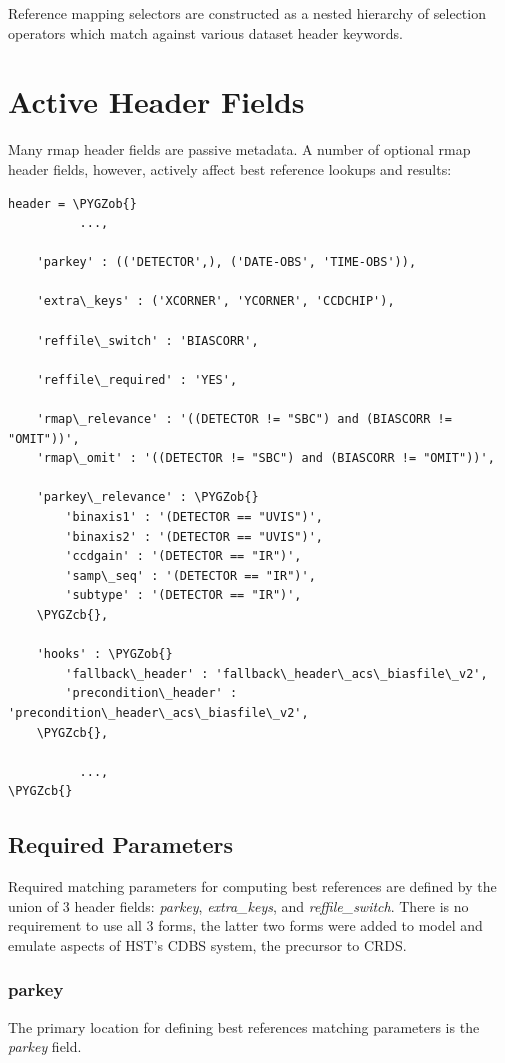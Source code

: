 \documentclass[letterpaper,10pt,english]{sphinxmanual}
\def\PYGZob{\char`\{}
\def\PYGZcb{\char`\}}
\begin{document}
Reference mapping selectors are constructed as a nested hierarchy of selection operators which match against
various dataset header keywords.


\section{Active Header Fields}
\label{rmap_syntax:active-header-fields}
Many rmap header fields are passive metadata.   A number of optional rmap header fields,  however,  actively affect
best reference lookups and results:

\begin{Verbatim}[commandchars=\\\{\}]
header = \PYGZob{}
          ...,

    'parkey' : (('DETECTOR',), ('DATE-OBS', 'TIME-OBS')),

    'extra\_keys' : ('XCORNER', 'YCORNER', 'CCDCHIP'),

    'reffile\_switch' : 'BIASCORR',

    'reffile\_required' : 'YES',

    'rmap\_relevance' : '((DETECTOR != "SBC") and (BIASCORR != "OMIT"))',
    'rmap\_omit' : '((DETECTOR != "SBC") and (BIASCORR != "OMIT"))',

    'parkey\_relevance' : \PYGZob{}
        'binaxis1' : '(DETECTOR == "UVIS")',
        'binaxis2' : '(DETECTOR == "UVIS")',
        'ccdgain' : '(DETECTOR == "IR")',
        'samp\_seq' : '(DETECTOR == "IR")',
        'subtype' : '(DETECTOR == "IR")',
    \PYGZcb{},

    'hooks' : \PYGZob{}
        'fallback\_header' : 'fallback\_header\_acs\_biasfile\_v2',
        'precondition\_header' : 'precondition\_header\_acs\_biasfile\_v2',
    \PYGZcb{},

          ...,
\PYGZcb{}
\end{Verbatim}


\subsection{Required Parameters}
\label{rmap_syntax:required-parameters}
Required matching parameters for computing best references are defined by the union of 3 header fields:  \emph{parkey},
\emph{extra\_keys}, and  \emph{reffile\_switch}.   There is no requirement to use all 3 forms,  the latter two forms were added
to model and emulate aspects of HST's CDBS system,  the precursor to CRDS.


\subsubsection{parkey}
\label{rmap_syntax:parkey}
The primary location for defining best references matching parameters is the \emph{parkey} field.
\end{document}
